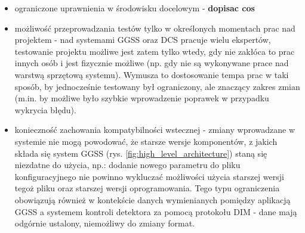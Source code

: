 \begin{itemize}
    \item ograniczone uprawnienia w środowisku docelowym - \textbf{dopisac cos}
    \item możliwość przeprowadzania testów tylko w określonych momentach prac nad projektem - nad systemami GGSS oraz DCS pracuje wielu ekspertów, testowanie projektu możliwe jest zatem tylko wtedy, gdy nie zakłóca to prac innych osób i jest fizycznie możliwe (np. gdy nie są wykonywane prace nad warstwą sprzętową systemu). Wymusza to dostosowanie tempa prac w taki sposób, by jednocześnie testowany był ograniczony, ale znaczący zakres zmian (m.in. by możliwe było szybkie wprowadzenie poprawek w przypadku wykrycia błędu).
    \item konieczność zachowania kompatybilności wstecznej - zmiany wprowadzane w systemie nie mogą powodować, że starsze wersje komponentów, z jakich składa się system GGSS (rys. \ref{fig:high_level_architecture}) staną się niezdatne do użycia, np.: dodanie nowego parametru do pliku konfiguracyjnego nie powinno wykluczać możliwości użycia starszej wersji tegoż pliku oraz starszej wersji oprogramowania. Tego typu ograniczenia obowiązują również w kontekście danych wymienianych pomiędzy aplikacją GGSS a systemem kontroli detektora za pomocą protokołu DIM - dane mają odgórnie ustalony, niemożliwy do zmiany format.
\end{itemize}

